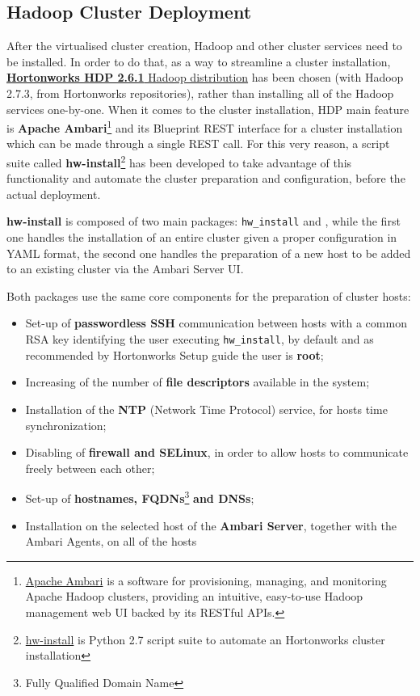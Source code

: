 \subsection{Hadoop Cluster Deployment}
After the virtualised cluster creation, Hadoop and other cluster services need to be installed. In order to do that, as a way to streamline a cluster installation, \href{https://hortonworks.com/products/data-platforms/hdp/}{\textbf{Hortonworks HDP 2.6.1} Hadoop distribution} has been chosen (with Hadoop 2.7.3, from Hortonworks repositories), rather than installing all of the Hadoop services one-by-one. When it comes to the cluster installation, HDP main feature is \textbf{Apache Ambari}\footnote{\href{https://ambari.apache.org/}{Apache Ambari} is a software for provisioning, managing, and monitoring Apache Hadoop clusters, providing an intuitive, easy-to-use Hadoop management web UI backed by its RESTful APIs.} and its Blueprint REST interface for a cluster installation which can be made through a single REST call. For this very reason, a script suite called \textbf{hw-install}\footnote{\href{https://github.com/fedexist/hw-install}{hw-install} is Python 2.7 script suite to automate an Hortonworks cluster installation} has been developed to take advantage of this functionality and automate the cluster preparation and configuration, before the actual deployment.

\textbf{hw-install} is composed of two main packages: \texttt{hw\_install} and \texttt{}, while the first one handles the installation of an entire cluster given a proper configuration in YAML format, the second one handles the preparation of a new host to be added to an existing cluster via the Ambari Server UI.

Both packages use the same core components for the preparation of cluster hosts:

\begin{itemize}
    \item Set-up of \textbf{passwordless SSH} communication between hosts with a common RSA key identifying the user executing \texttt{hw\_install}, by default and as recommended by Hortonworks Setup guide the user is \textbf{root};
    \item Increasing of the number of \textbf{file descriptors} available in the system;
    \item Installation of the \textbf{NTP} (Network Time Protocol) service, for hosts time synchronization;
    \item Disabling of \textbf{firewall and SELinux}, in order to allow hosts to communicate freely between each other;
    \item Set-up of \textbf{hostnames, FQDNs}\footnote{Fully Qualified Domain Name} \textbf{and DNSs};
    \item Installation on the selected host of the \textbf{Ambari Server}, together with the Ambari Agents, on all of the hosts
\end{itemize}

